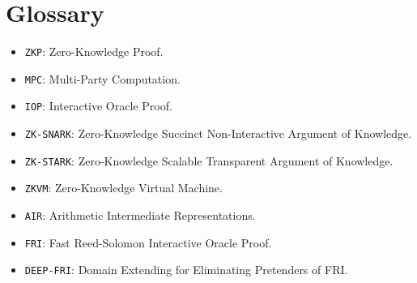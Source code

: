 \section{Glossary} \label{sec:glossary}

\begin{itemize}
    \item \verb|ZKP|: Zero-Knowledge Proof.
    \item \verb|MPC|: Multi-Party Computation.
    \item \verb|IOP|: Interactive Oracle Proof.
    \item \verb|ZK-SNARK|: Zero-Knowledge Succinct Non-Interactive Argument of Knowledge.
    \item \verb|ZK-STARK|: Zero-Knowledge Scalable Transparent Argument of Knowledge.
    \item \verb|ZKVM|: Zero-Knowledge Virtual Machine.
    \item \verb|AIR|: Arithmetic Intermediate Representations.
    \item \verb|FRI|: Fast Reed-Solomon Interactive Oracle Proof.
    \item \verb|DEEP-FRI|: Domain Extending for Eliminating Pretenders of FRI.
\end{itemize}